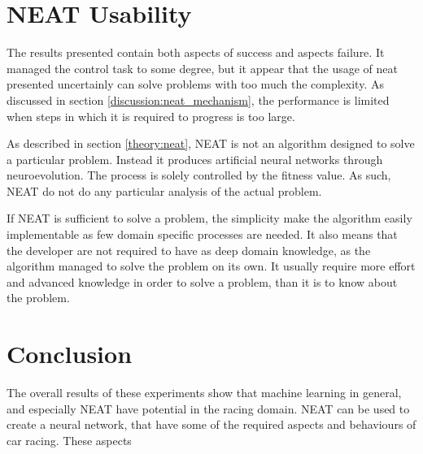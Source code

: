 \section{NEAT Usability}

The results presented contain both aspects of success and aspects failure. It managed the control task to some degree, but it appear that the usage of neat presented uncertainly can solve problems with too much the complexity. As discussed in section \ref{discussion:neat_mechanism}, the performance is limited when steps in which it is required to progress is too large.

As described in section \ref{theory:neat}, NEAT is not an algorithm designed to solve a particular problem. Instead it produces artificial neural networks through neuroevolution. The process is solely controlled by the fitness value. As such, NEAT do not do any particular analysis of the actual problem. 

If NEAT is sufficient to solve a problem, the simplicity make the algorithm easily implementable as few domain specific processes are needed. It also means that the developer are not required to have as deep domain knowledge, as the algorithm managed to solve the problem on its own. It usually require more effort and advanced knowledge in order to solve a problem, than it is to know about the problem.

\section{Conclusion}
\label{conclusion}
The overall results of these experiments show that machine learning in general, and especially NEAT have potential in the racing domain. NEAT can be used to create a neural network, that have some of the required aspects and behaviours of car racing. These aspects 








